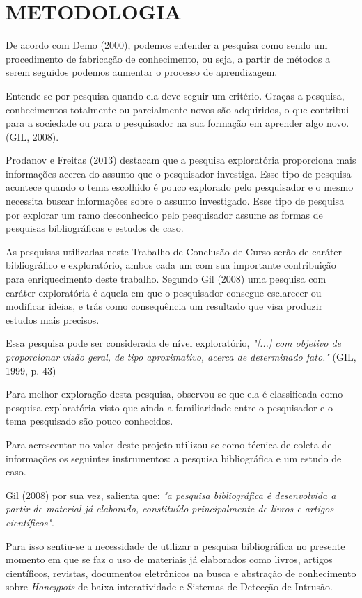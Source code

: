 \chapter{METODOLOGIA}
De acordo com Demo (2000), podemos entender a pesquisa como sendo um procedimento de fabricação de conhecimento, ou seja, a partir de métodos a serem seguidos podemos aumentar o processo de aprendizagem.

Entende-se por pesquisa quando ela deve seguir um critério. Graças a pesquisa, conhecimentos totalmente ou parcialmente novos são adquiridos, o que contribui para a sociedade ou para o pesquisador na sua formação em aprender algo novo. (GIL, 2008).

Prodanov e Freitas (2013) destacam que a pesquisa exploratória proporciona mais informações acerca do assunto que o pesquisador investiga. Esse tipo de pesquisa acontece quando o tema escolhido é pouco explorado pelo pesquisador e o mesmo necessita buscar informações sobre o assunto investigado. Esse tipo de pesquisa por explorar um ramo desconhecido pelo pesquisador assume as formas de pesquisas bibliográficas e estudos de caso.

As pesquisas utilizadas neste Trabalho de Conclusão de Curso serão de caráter bibliográfico e exploratório, ambos cada um com sua importante contribuição para enriquecimento deste trabalho. Segundo Gil (2008) uma pesquisa com caráter exploratória é aquela em que o pesquisador consegue esclarecer ou modificar ideias, e trás como consequência um resultado que visa produzir estudos mais precisos.

Essa pesquisa pode ser considerada de nível exploratório, \textit{"[...] com objetivo de proporcionar visão geral, de tipo aproximativo, acerca de determinado fato."} (GIL, 1999, p. 43)

Para melhor exploração desta pesquisa, observou-se que ela é classificada como pesquisa exploratória visto que ainda a familiaridade entre o pesquisador e o tema pesquisado são pouco conhecidos.

Para acrescentar no valor deste projeto utilizou-se como técnica de coleta de informações os seguintes instrumentos: a pesquisa bibliográfica e um estudo de caso.

Gil (2008) por sua vez, salienta que: \textit{"a pesquisa bibliográfica é desenvolvida a partir de material já elaborado, constituído principalmente de livros e artigos científicos"}.

Para isso sentiu-se a necessidade de utilizar a pesquisa bibliográfica no presente momento em que se faz o uso de materiais já elaborados como livros, artigos científicos, revistas, documentos eletrônicos na busca e abstração de conhecimento sobre \textit{Honeypots} de baixa interatividade e Sistemas de Detecção de Intrusão.


